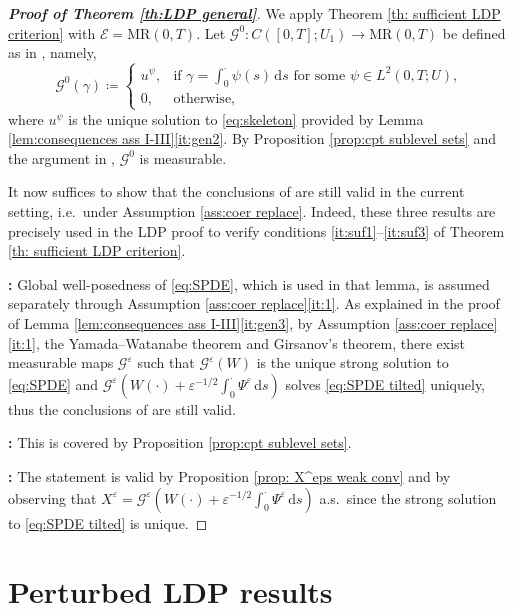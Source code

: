 \documentclass{amsart}
\newcommand{\dd}{\,\mathrm{d}}
\renewcommand{\MR}{\mathrm{MR}}
\newcommand{\<}{\langle}
\newcommand{\?}{\rangle}
\newcommand{\ceqq}{\coloneqq}
\newcommand{\bphieps}{\Psi^{\eps}}
\theoremstyle{plain}
\theoremstyle{remark}
\theoremstyle{plain}
\numberwithin{equation}{section}
\newcommand{\G}{\mathcal{G}}
\newcommand{\eps}{\varepsilon}
\begin{document}
\begin{proof}[\textbf{Proof of Theorem \ref{th:LDP general}}] 
We apply Theorem \ref{th: sufficient LDP criterion} with $\mathcal E=\MR(0,T)$. 
Let $\G^0\colon C([0,T];U_1)\to\MR(0,T)$ be defined as in
\cite[(4.4)]{TV24}, namely, 
\[
\G^0(\gamma)\ceqq
\begin{cases}
u^\psi,
& \text{if } 
\gamma=\int_0^\cdot\psi(s)\dd s
\text{ for some }\psi\in L^2(0,T;U),\\
0,
&\text{otherwise},
\end{cases}
\]
where $u^\psi$ is the unique solution to \eqref{eq:skeleton} provided by Lemma \ref{lem:consequences ass I-III}\ref{it:gen2}. 
By Proposition \ref{prop:cpt sublevel sets} and the argument in \cite[Rem.\ 4.10]{TV24},  $\G^0$ is measurable.

It now suffices to show that the conclusions of \cite[Lem.\ 4.6, Prop.\ 4.9, Prop.\ 4.12]{TV24} are still valid in the current setting, i.e.\  under Assumption \ref{ass:coer replace}. Indeed, these three results are precisely used in the LDP proof \cite[Th.\ 2.6, p. 32]{TV24} to verify conditions \ref{it:suf1}--\ref{it:suf3} of Theorem \ref{th: sufficient LDP criterion}. 

 
\textbf{\cite[Lem.\ 4.6]{TV24}:}  
Global well-posedness of \eqref{eq:SPDE}, which is used in that lemma, is assumed separately through 
Assumption \ref{ass:coer replace}\ref{it:1}.
As explained in the proof of Lemma \ref{lem:consequences ass I-III}\ref{it:gen3}, by Assumption \ref{ass:coer replace}\ref{it:1}, the Yamada--Watanabe theorem and Girsanov's theorem, there exist measurable maps $\G^\eps$ such that $\G^\eps(W)$ is the unique strong solution to \eqref{eq:SPDE} and  $\G^\eps(W(\cdot)+\eps^{-1/2}\int_0^\cdot \bphieps\dd s)$   solves \eqref{eq:SPDE tilted} uniquely, thus the conclusions of \cite[Lem.\ 4.6]{TV24} are still valid.  


\textbf{\cite[Prop.\ 4.9]{TV24}:} 
This is covered by Proposition \ref{prop:cpt sublevel sets}.  

\textbf{\cite[Prop.\ 4.12]{TV24}:} The statement is valid by Proposition \ref{prop: X^eps weak conv} 
 and by observing that $X^\eps=\G^\eps(W(\cdot)+\eps^{-1/2}\int_0^\cdot \bphieps\dd s)$ a.s.\  since the strong solution to \eqref{eq:SPDE tilted} is unique.  
\end{proof}

 

\section{Perturbed LDP results}\label{sec:perturb}
\end{document}
